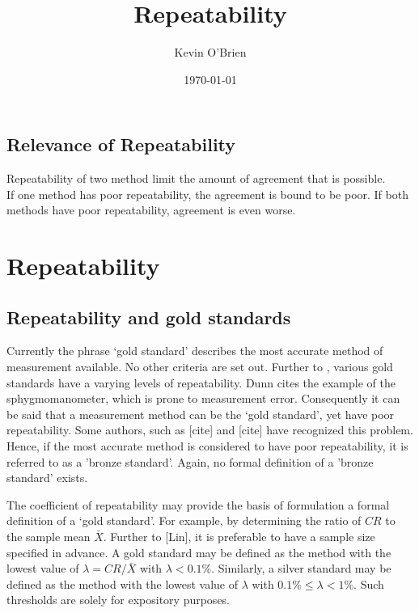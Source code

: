 \documentclass[12pt, a4paper]{article}
\begin{document}
\author{Kevin O'Brien}
\title{Repeatability}
\date{\today}
\maketitle
\tableofcontents



\newpage


\subsection{Relevance of Repeatability} 
Repeatability of two method limit the amount of agreement that is possible.\\
If one method has poor repeatability, the agreement is bound to be poor. If both methods have poor repeatability, agreement is
even worse.


\section{Repeatability}
\subsection{Repeatability and gold standards}
Currently the phrase `gold standard' describes the most accurate method of measurement available. No other criteria are set out. Further to \citet{dunnSEME}, various gold standards have a varying levels of repeatability. Dunn cites the example of the sphygmomanometer, which is prone to measurement error. Consequently it can be said that a measurement method can be the `gold standard', yet have poor repeatability. Some authors, such as [cite] and [cite] have recognized this problem. Hence, if the most accurate method is considered to have poor repeatability, it is referred to as a 'bronze standard'.  Again, no formal definition of a 'bronze standard' exists.

The coefficient of repeatability may provide the basis of formulation a formal definition of a `gold standard'. For example, by determining the ratio of $CR$ to the sample mean $\bar{X}$. Further to [Lin], it is preferable to have a sample size specified in advance. A gold standard may be defined as the method with the lowest value of $\lambda = CR /\bar{X}$ with $\lambda < 0.1\%$. Similarly, a silver standard may be defined as the method with the lowest value of $\lambda $ with $0.1\% \leq \lambda < 1\%$. Such thresholds are solely for expository purposes.
\end{document}

